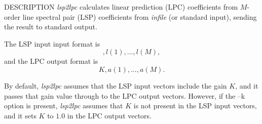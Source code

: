 % 
% 
% 
% 
%                                                                        
%

\begin{synopsis}
\item [lsp2lpc] [ --m $M$ ] [ --s $S$ ] [ --k ] [ --l ] [ --i $I$ ] [ {\em infile} ] 
\end{synopsis}

\begin{qsection}{DESCRIPTION}
{\em lsp2lpc} calculates linear prediction (LPC) coefficients 
from $M$-order line spectral pair (LSP) coefficients 
from {\em infile} (or standard input),
sending the result to standard output.

The LSP input input format is
\begin{displaymath}
   [ K ], l(1), \dots , l(M), 
\end{displaymath}
and the LPC output format is
\begin{displaymath}
   K , a(1), \dots , a(M).
\end{displaymath}

By default, {\em lsp2lpc} assumes that 
the LSP input vectors include the gain $K$, 
and it passes that gain value through to the LPC output vectors.  
However, if the --k option is present, 
{\em lsp2lpc} assumes that $K$ is not present in the LSP input vectors, 
and it sets $K$ to $1.0$ in the LPC output vectors.
\end{qsection}


